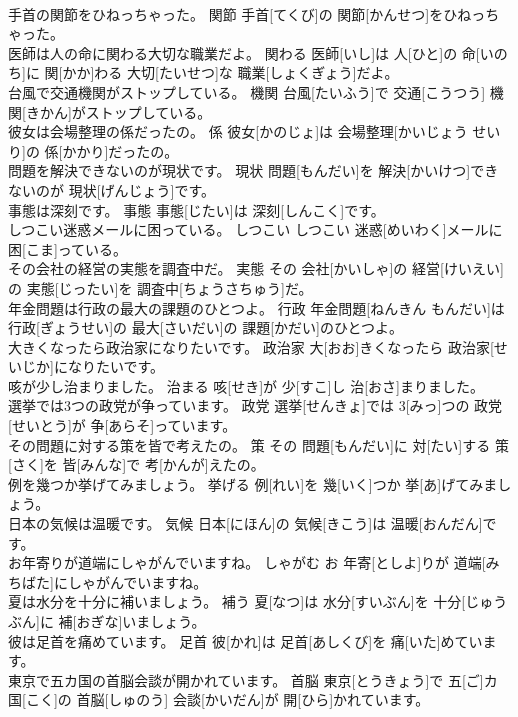 \documentclass[8pt]{extreport}
\begin{document}
\begin{CJK}{UTF8}{min}
\\	手首の関節をひねっちゃった。	関節	手首[てくび]の 関節[かんせつ]をひねっちゃった。	
\\	医師は人の命に関わる大切な職業だよ。	関わる	医師[いし]は 人[ひと]の 命[いのち]に 関[かか]わる 大切[たいせつ]な 職業[しょくぎょう]だよ。	
\\	台風で交通機関がストップしている。	機関	台風[たいふう]で 交通[こうつう] 機関[きかん]がストップしている。	
\\	彼女は会場整理の係だったの。	係	彼女[かのじょ]は 会場整理[かいじょう せいり]の 係[かかり]だったの。	
\\	問題を解決できないのが現状です。	現状	問題[もんだい]を 解決[かいけつ]できないのが 現状[げんじょう]です。	
\\	事態は深刻です。	事態	事態[じたい]は 深刻[しんこく]です。	
\\	しつこい迷惑メールに困っている。	しつこい	しつこい 迷惑[めいわく]メールに 困[こま]っている。	
\\	その会社の経営の実態を調査中だ。	実態	その 会社[かいしゃ]の 経営[けいえい]の 実態[じったい]を 調査中[ちょうさちゅう]だ。	
\\	年金問題は行政の最大の課題のひとつよ。	行政	年金問題[ねんきん もんだい]は 行政[ぎょうせい]の 最大[さいだい]の 課題[かだい]のひとつよ。	
\\	大きくなったら政治家になりたいです。	政治家	大[おお]きくなったら 政治家[せいじか]になりたいです。	
\\	咳が少し治まりました。	治まる	咳[せき]が 少[すこ]し 治[おさ]まりました。	
\\	選挙では3つの政党が争っています。	政党	選挙[せんきょ]では 3[みっ]つの 政党[せいとう]が 争[あらそ]っています。	
\\	その問題に対する策を皆で考えたの。	策	その 問題[もんだい]に 対[たい]する 策[さく]を 皆[みんな]で 考[かんが]えたの。	
\\	例を幾つか挙げてみましょう。	挙げる	例[れい]を 幾[いく]つか 挙[あ]げてみましょう。	
\\	日本の気候は温暖です。	気候	日本[にほん]の 気候[きこう]は 温暖[おんだん]です。	
\\	お年寄りが道端にしゃがんでいますね。	しゃがむ	お 年寄[としよ]りが 道端[みちばた]にしゃがんでいますね。	
\\	夏は水分を十分に補いましょう。	補う	夏[なつ]は 水分[すいぶん]を 十分[じゅうぶん]に 補[おぎな]いましょう。	
\\	彼は足首を痛めています。	足首	彼[かれ]は 足首[あしくび]を 痛[いた]めています。	
\\	東京で五カ国の首脳会談が開かれています。	首脳	東京[とうきょう]で 五[ご]カ 国[こく]の 首脳[しゅのう] 会談[かいだん]が 開[ひら]かれています。	

\end{CJK}
\end{document}

